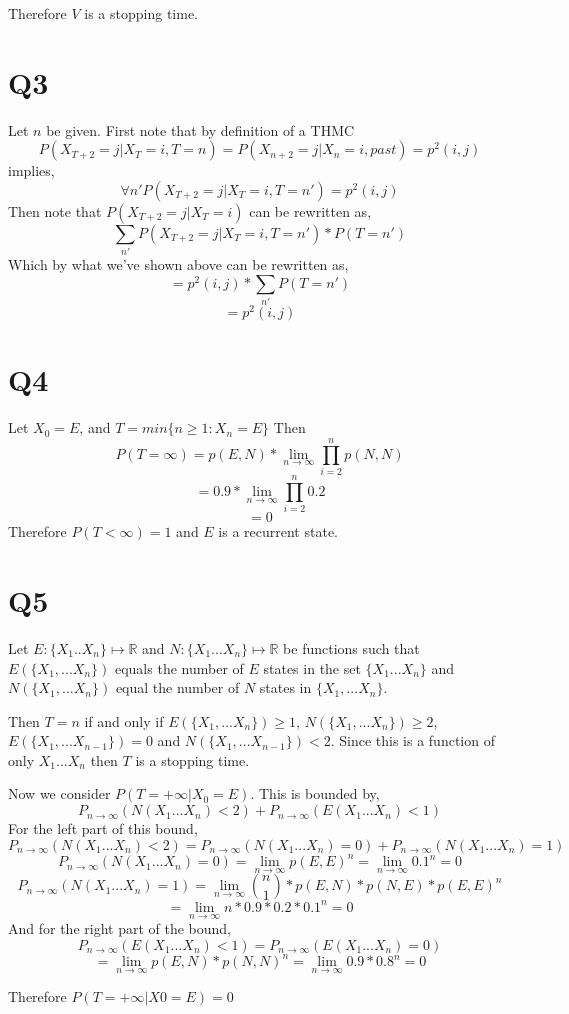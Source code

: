 \documentclass{article}
\begin{document}
Therefore $V$ is a stopping time.

\section*{Q3}
Let $n$ be given. First note that by definition of a THMC
\[
P(X_{T+2} = j | X_T = i , T = n) = P(X_{n+2} = j | X_n = i, past) = p^2(i,j)
\]
implies,
\[
\forall n'
P(X_{T+2} = j | X_T = i , T = n') = p^2(i,j)
\]
Then note that $P(X_{T+2} = j | X_T = i)$ can be rewritten as,
\[
\sum_{n'} P(X_{T+2} = j | X_T = i, T=n')*P(T=n')
\]
Which by what we've shown above can be rewritten as,
\[
= p^2(i,j) * \sum_{n'} P(T=n')
\] 
\[
=p^2(i,j)
\]

\section*{Q4}
Let $X_0 = E$, and $T = min\{n \geq 1 : X_n = E\}$
Then 
\[
P(T = \infty) = p(E,N) * \lim_{n \to \infty} \prod_{i = 2}^{n} p(N,N)
\]
\[
= 0.9 * \lim_{n \to \infty} \prod_{i = 2}^{n} 0.2
\]
\[
= 0
\]
Therefore $P(T < \infty) = 1$ and $E$ is a recurrent state.

\section*{Q5}
Let $E : \{X_1 .. X_n\} \mapsto \mathbb{R}$ and $N : \{X_1 ... X_n\} \mapsto \mathbb{R}$ be functions such that $E(\{X_1, ... X_n\})$ equals the number of $E$ states in the set $\{X_1 ... X_n\}$ and $N(\{X_1, ... X_n\})$ equal the number of $N$ states in $\{X_1, ... X_n\}$. 

Then $T = n$ if and only if $E(\{X_1,... X_n\}) \geq 1$, $N(\{X_1,... X_n\}) \geq 2$, $E(\{X_1,... X_{n-1}\}) = 0$ and $N(\{X_1,... X_{n-1}\}) < 2$. Since this is a function of only $X_1 ... X_n$ then $T$ is a stopping time. 

Now we consider $P(T = +\infty | X_0 = E)$.
This is bounded by,
\[
P_{n \to \infty}(N(X_1 ... X_n) < 2) + P_{n \to \infty}(E(X_1 ... X_n) < 1)
\]
For the left part of this bound,
\[
P_{n \to \infty}(N(X_1 ... X_n) < 2) = P_{n \to \infty}(N(X_1 ... X_n) = 0) + 
P_{n \to \infty}(N(X_1 ... X_n) = 1)
\]
\[
P_{n \to \infty}(N(X_1 ... X_n) = 0) = \lim_{n \to \infty} p(E,E)^n =\lim_{n \to \infty} 0.1^n = 0
\]
\[
P_{n \to \infty}(N(X_1 ... X_n) = 1) = \lim_{n \to \infty} {{n}\choose{1}} * p(E,N) * p(N,E) * p(E,E)^n
\]
\[
= \lim_{n \to \infty} n * 0.9 * 0.2 * 0.1 ^n = 0
\]
And for the right part of the bound,
\[ 
P_{n \to \infty}(E(X_1 ... X_n) < 1) = P_{n \to \infty}(E(X_1 ... X_n) = 0)
\]
\[
= \lim_{n \to \infty} p(E,N) * p(N,N)^n = \lim_{n \to \infty} 0.9 * 0.8 ^ n = 0
\]

Therefore $P( T = +\infty | X0 = E) = 0$
\end{document}
